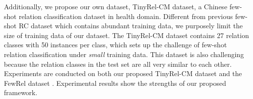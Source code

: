Additionally, we propose our own dataset, TinyRel-CM dataset,
a Chinese few-shot relation classification dataset in health domain. 
Different from previous few-shot RC dataset which contains abundant training data, we purposely limit the size of training data of our dataset.
The TinyRel-CM dataset contains 27 relation classes with 50 instances per class, 
which sets up the challenge of few-shot relation classification under \emph{small} training data. 
This dataset
is also challenging because the relation classes in the test set are all very similar to each
other. %
Experiments are conducted on both our proposed TinyRel-CM dataset and the FewRel dataset \cite{han-etal-2018-fewrel}. Experimental results show the strengths of our proposed framework.


